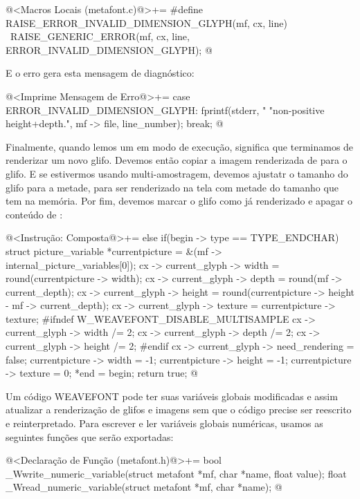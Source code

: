 {{{{{{\iniciocodigo
@<Macros Locais (metafont.c)@>+=
#define RAISE_ERROR_INVALID_DIMENSION_GLYPH(mf, cx, line) {\
  RAISE_GENERIC_ERROR(mf, cx, line, ERROR_INVALID_DIMENSION_GLYPH);}
@
\fimcodigo

E o erro gera esta mensagem de diagnóstico:

\iniciocodigo
@<Imprime Mensagem de Erro@>+=
case ERROR_INVALID_DIMENSION_GLYPH:
  fprintf(stderr,
          "%
          "non-positive height+depth.", mf -> file, line_number);
  break;
@
\fimcodigo




Finalmente, quando lemos um  em modo de execução,
significa que terminamos de renderizar um novo glifo. Devemos então
copiar a imagem renderizada de \monoespaco{currentícture} para o
glifo. E se estivermos usando multi-amostragem, devemos ajustatr o
tamanho do glifo para a metade, para ser renderizado na tela com
metade do tamanho que tem na memória. Por fim, devemos marcar o glifo
como já renderizado e apagar o conteúdo
de :

\iniciocodigo
@<Instrução: Composta@>+=
else if(begin -> type == TYPE_ENDCHAR){
  struct picture_variable *currentpicture =
                                        &(mf -> internal_picture_variables[0]);
  cx -> current_glyph -> width = round(currentpicture -> width);
  cx -> current_glyph -> depth = round(mf -> current_depth);
  cx -> current_glyph -> height = round(currentpicture -> height -
                                        mf -> current_depth);
  cx -> current_glyph -> texture = currentpicture -> texture;
#ifndef W_WEAVEFONT_DISABLE_MULTISAMPLE
  cx -> current_glyph -> width /= 2;
  cx -> current_glyph -> depth /= 2;
  cx -> current_glyph -> height /= 2;
#endif
  cx -> current_glyph -> need_rendering = false;
  currentpicture -> width = -1;
  currentpicture -> height = -1;
  currentpicture -> texture = 0;
  *end = begin;
  return true;
}
@
\fimcodigo


Um código WEAVEFONT pode ter suas variáveis globais modificadas e
assim atualizar a renderização de glifos e imagens sem que o código
precise ser reescrito e reinterpretado. Para escrever e ler variáveis
globais numéricas, usamos as seguintes funções que serão exportadas:

\iniciocodigo
@<Declaração de Função (metafont.h)@>+=
bool _Wwrite_numeric_variable(struct metafont *mf, char *name, float value);
float _Wread_numeric_variable(struct metafont *mf, char *name);
@
\fimcodigo

}}}}}}

